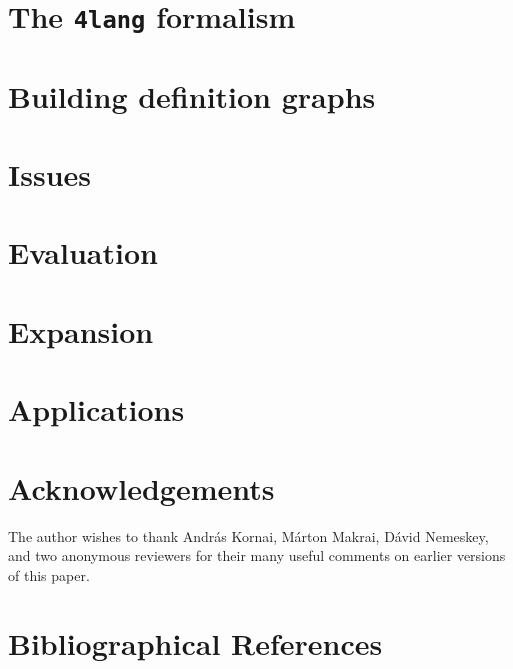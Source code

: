 \documentclass[10pt, a4paper]{article}
\begin{document}
\section{The \texttt{4lang} formalism}
\label{sec:4lang}


\section{Building definition graphs}
\label{sec:defgraphs}



\section{Issues}
\label{sec:issues}




\section{Evaluation}
\label{sec:eval}



\section{Expansion}
\label{sec:expansion}


\section{Applications}
\label{sec:applications}


 \section{Acknowledgements}
 The author wishes to thank Andr\'as Kornai, M\'arton Makrai, D\'avid Nemeskey,
 and two anonymous reviewers for their many useful comments on earlier versions
 of this paper.

\section{Bibliographical References}
\label{main:ref}



\end{document}
